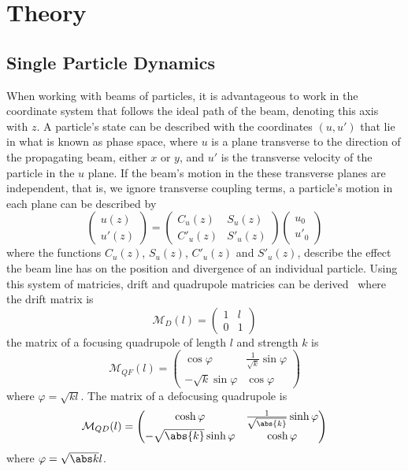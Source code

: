 
\section{Theory}

\subsection{Single Particle Dynamics}

When working with beams of particles, it is advantageous to work in the
coordinate system that follows the ideal path of the beam, denoting this axis
with \(z\). A particle's state can be described with the coordinates \((u, u')\)
that lie in what is known as phase space, where \(u\) is a plane transverse to
the direction of the propagating beam, either \(x\) or \(y\), and \(u'\) is the
transverse velocity of the particle in the \(u\) plane.  If the beam's motion in
the these transverse planes are independent, that is, we ignore transverse
coupling terms, a particle's motion in each plane can be described by
\begin{equation}
	\begin{pmatrix}
		u(z) \\ u'(z)
	\end{pmatrix}
	=
	\begin{pmatrix}
		C_u(z)  & S_u(z)  \\
		C'_u(z) & S'_u(z)
	\end{pmatrix}
	\begin{pmatrix}
		u_0 \\ u'_0
	\end{pmatrix}
\end{equation}
where the functions \(C_u(z)\), \(S_u(z)\), \(C'_u(z)\) and \(S'_u(z)\),
describe the effect the beam line has on the position and divergence of an
individual particle. Using this system of matricies, drift and quadrupole
matricies can be derived~\cite{wiedemann2007particle} where the drift matrix is
\begin{equation}
	\mathcal{M}_D(l) =
	\begin{pmatrix}
		1 & l \\
		0 & 1
	\end{pmatrix}
	\label{eq:drift}
\end{equation}
the matrix of a focusing quadrupole of length \(l\) and strength \(k\) is
\begin{equation}
	\mathcal{M}_{QF}(l) =
	\begin{pmatrix}
		\cos\varphi & \frac{1}{\sqrt{k}}\sin\varphi \\
		-\sqrt{k}\sin\varphi & \cos\varphi
	\end{pmatrix}
	\label{eq:qf}
\end{equation}
where \(\varphi = \sqrt{kl}\). The matrix of a defocusing quadrupole is
\begin{equation}
	\mathcal{M}_{QD}(l) =
	\begin{pmatrix}
		\cosh\varphi & \frac{1}{\sqrt{\abs{k}}}\sinh\varphi \\
		-\sqrt{\abs{k}}\sinh\varphi & \cosh\varphi
	\end{pmatrix}
	\label{eq:qd}
\end{equation}
where \(\varphi = \sqrt{\abs k}l\).

